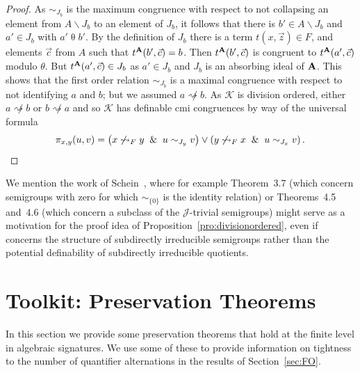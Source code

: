 \documentclass[10pt,a4paper]{amsart}
\theoremstyle{plain}
\theoremstyle{definition}
\newcommand{\divides}{\rightsquigarrow}
\begin{document}
\begin{proof}
As  $\sim_{J_b}$ is the maximum congruence with respect to not collapsing an element from $A\backslash J_b$ to an element of $J_b$, it follows that there is $b'\in A\backslash J_b$ and $a'\in J_b$ with $a'\mathrel{\theta}b'$.  
By the definition of $J_b$ there is a term $t(x,\vec{z})\in F$, and elements $\vec{c}$ from $A$ such that $t^{\bf A}(b',\vec{c})=b$.  Then $t^{\bf A}(b',\vec{c})$ is congruent to $t^{\bf A}(a',\vec{c})$ modulo $\theta$.  
But $t^{\bf A}(a',\vec{c})\in J_b$ as $a'\in J_b$ and $J_b$ is an absorbing ideal of ${\bf A}$.  
This shows that the first order relation $\sim_{J_b}$ is a maximal congruence with respect to not identifying $a$ and $b$; but we assumed $a\not\divides b$.  
As $\mathscr{K}$ is division ordered, either $a\not\divides b$ or $b\not\divides a$ and so $\mathscr{K}$ has definable cmi congruences by way of the universal formula 
\[
\pi_{x,y}(u,v)=\left(x\not\divides_{F}y\And u\sim_{J_y} v\right)\vee\left(y\not\divides_{F}x\And u\sim_{J_x} v\right).\qedhere
\]
\end{proof}
We mention the work of Schein~\cite{sch66}, where for example Theorem~3.7 (which concern semigroups with zero for which $\sim_{\{0\}}$ is the identity relation) or Theorems~4.5 and~4.6 (which concern a subclass of the $\mathscr{J}$-trivial semigroups) might serve as a motivation for the proof idea of Proposition~\ref{pro:divisionordered}, even if \cite{sch66} concerns the structure of subdirectly irreducible semigroups rather than the potential definability of subdirectly irreducible quotients.

\section{Toolkit: Preservation Theorems}\label{sec:preservation}
 In this section we provide some preservation theorems that hold at the finite level in algebraic signatures.  
We use some of these to provide information on tightness to the number of quantifier alternations in the results of Section~\ref{sec:FO}.
 
\end{document}
